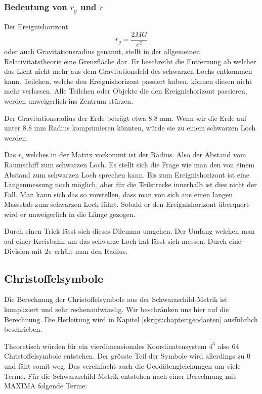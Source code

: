\begin{refsection}
	\subsubsection{Bedeutung von $r_{g}$ und $r$}
 	Der Ereignishorizont 
     \begin{equation} \label{Gravitationsradius}
     r_{g}= \frac{2MG}{c^2}
     \end{equation}
     oder auch Gravitationsradius genannt, stellt in der allgemeinen Relativitätstheorie eine Grenzfläche dar. Er beschreibt die Entfernung ab welcher das Licht nicht mehr aus dem Gravitationsfeld des schwarzen Lochs entkommen kann. Teilchen, welche den Ereignishorizont passiert haben, können diesen nicht mehr verlassen. Alle Teilchen oder Objekte die den Ereignishorizont passieren, werden unweigerlich ins Zentrum stürzen. 
	
	Der Gravitationsradius der Erde beträgt etwa 8.8 mm. Wenn wir die Erde auf unter 8.8 mm Radius komprimieren könnten, würde sie zu einem schwarzen Loch werden.
    
    Das $r$, welches in der Matrix vorkommt ist der Radius. Also der Abstand vom Raumschiff zum schwarzen Loch. Es stellt sich die Frage wie man den von einem Abstand zum schwarzen Loch sprechen kann. Bis zum Ereignishorizont ist eine Längenmessung noch möglich, aber für die Teilstrecke innerhalb ist dies nicht der Fall. Man kann sich das so vorstellen, dass man von sich aus einen langen Massstab zum schwarzen Loch führt. Sobald er den Ereignishorizont überquert wird er unweigerlich in die Länge gezogen.
    
    Durch einen Trick lässt sich dieses Dilemma umgehen. Der Umfang welchen man auf einer Kreisbahn um das schwarze Loch hat lässt sich messen. Durch eine Division mit $2\pi$ erhält man den Radius.
	
	\subsection{Christoffelsymbole}\label{skript:chapter:zeitreisen:christoffel}
	
	Die Berechnung der Christoffelsymbole aus der Schwarzschild-Metrik ist kompliziert und sehr rechenaufwändig. Wir beschränken uns hier auf die Berechnung. Die Herleitung wird in Kapitel \ref{skript:chapter:geodaeten} ausführlich beschrieben. 
	
	Theoretisch würden für ein vierdimensionales Koordinatensystem $4^{3}$ also $64$ Christoffelsymbole entstehen. Der grösste Teil der Symbole wird allerdings zu $0$ und fällt somit weg. Das vereinfacht auch die Geodätengleichungen um viele Terme. 
	Für die Schwarzschild-Metrik entstehen nach einer Berechnung mit MAXIMA folgende Terme:
	

\end{refsection}
